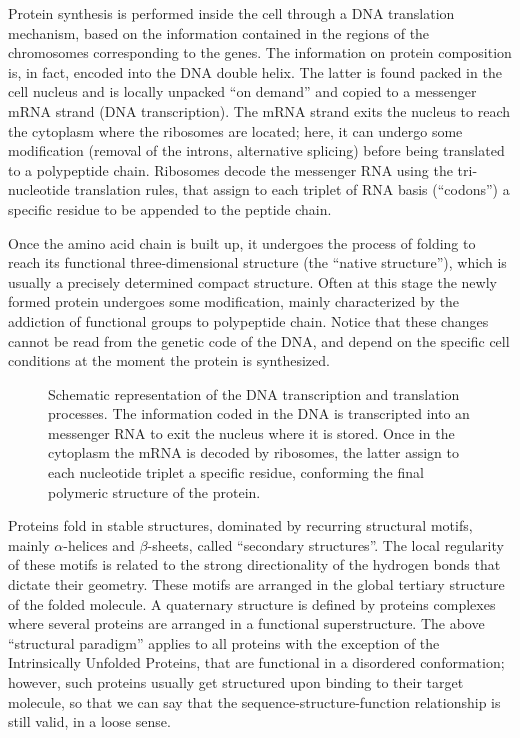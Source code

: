 Protein synthesis is performed inside the cell through a DNA translation
mechanism,  based on the information contained in  the regions of the chromosomes corresponding to the genes.
The information on protein composition is, in fact, encoded into the DNA double
helix. The latter is found packed in the cell nucleus and is locally unpacked
``on demand'' and copied to a messenger mRNA strand (DNA transcription).
The mRNA strand exits the nucleus to reach the cytoplasm where the ribosomes are
located;  here, it can
undergo some modification (removal of the introns, alternative splicing) before being translated to a polypeptide chain.
Ribosomes decode the messenger RNA using the tri-nucleotide translation rules, that assign to each triplet
of RNA basis (``codons'') a specific residue to be appended to the peptide chain.

Once the amino acid chain is built up, it undergoes the process of folding to reach
its functional three-dimensional structure (the ``native structure''), which  is usually a precisely determined compact structure.
Often at this stage  the  newly formed protein undergoes some modification, mainly
characterized by the addiction of functional groups to polypeptide chain.
Notice that these changes cannot be read from the genetic code of the DNA, and depend on the specific cell conditions at the moment the protein is synthesized. 


\begin{figure}
\centering
\def\svgwidth{0.8\textwidth}

\caption{Schematic representation of the DNA transcription and translation
processes. The information coded in the DNA is transcripted into an messenger
RNA to exit the nucleus where it is stored. Once in the cytoplasm the mRNA is
decoded by ribosomes, the latter assign to each nucleotide triplet a specific
residue, conforming the final polymeric structure of the protein.}
\end{figure}

Proteins fold in stable structures, dominated by
recurring structural motifs, mainly $\alpha$-helices and $\beta$-sheets,
called ``secondary structures''.  
The local regularity of these motifs is related to the strong directionality  of the hydrogen bonds that dictate their geometry.
These motifs are arranged in the global tertiary structure of the folded molecule.
A quaternary structure is defined by proteins complexes where several proteins
are arranged in a functional superstructure.
The above ``structural paradigm'' applies to all proteins with the exception of
the Intrinsically Unfolded Proteins, that are functional in a disordered
conformation; however, such proteins usually get structured upon binding to
their target molecule, so that  we can say that the sequence-structure-function
relationship is still valid, in a loose sense.

